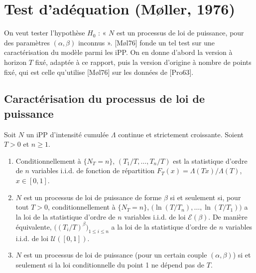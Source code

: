 \section{Test d'adéquation (Møller, 1976)}\label{sec:adequation}

On veut tester l'hypothèse $H_0$ : « $N$ est un processus de loi de puissance, pour des paramètres $(\alpha,\beta)$ inconnus ». [Møl76] fonde un tel test sur une caractérisation du modèle parmi les iPP. On en donne d'abord la version à horizon $T$ fixé, adaptée à ce rapport, puis la version d'origine à nombre de points fixé, qui est celle qu'utilise [Møl76] sur les données de [Pro63].

\subsection{Caractérisation du processus de loi de puissance}\label{sec:caracterisation}

\begin{theoreme}\label{thm:caracT}
Soit $N$ un iPP d'intensité cumulée $\Lambda$ continue et strictement croissante. Soient $T>0$ et $n\ge1$.
\begin{enumerate}
\item Conditionnellement à $\{N_T=n\}$, $(T_1/T,\dots,T_n/T)$ est la statistique d'ordre de $n$ variables i.i.d. de fonction de répartition $F_T(x)=\Lambda(Tx)/\Lambda(T)$, $x\in[0,1]$.
\item $N$ est un processus de loi de puissance de forme $\beta$ si et seulement si, pour tout $T>0$, conditionnellement à $\{N_T=n\}$, $\big(\ln(T/T_n),\dots,\ln(T/T_1)\big)$ a la loi de la statistique d'ordre de $n$ variables i.i.d. de loi $\mathcal{E}(\beta)$. De manière équivalente, $\big((T_i/T)^\beta\big)_{1\le i\le n}$ a la loi de la statistique d'ordre de $n$ variables i.i.d. de loi $\mathcal{U}([0,1])$.
\item $N$ est un processus de loi de puissance (pour un certain couple $(\alpha,\beta)$) si et seulement si la loi conditionnelle du point 1 ne dépend pas de $T$.
\end{enumerate}
\end{theoreme}

